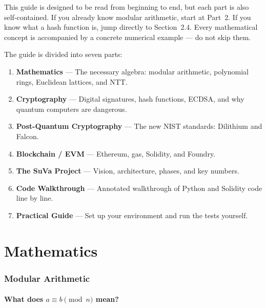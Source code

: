 \documentclass[11pt,a4paper]{article}
\begin{document}
\begin{infobox}
This guide is designed to be read from beginning to end, but each part is also self-contained.
If you already know modular arithmetic, start at Part~2.
If you know what a hash function is, jump directly to Section~2.4.
Every mathematical concept is accompanied by a concrete numerical example --- do not skip them.
\end{infobox}

The guide is divided into seven parts:

\begin{enumerate}
  \item \textbf{Mathematics} --- The necessary algebra: modular arithmetic, polynomial rings, Euclidean lattices, and NTT.
  \item \textbf{Cryptography} --- Digital signatures, hash functions, ECDSA, and why quantum computers are dangerous.
  \item \textbf{Post-Quantum Cryptography} --- The new NIST standards: Dilithium and Falcon.
  \item \textbf{Blockchain / EVM} --- Ethereum, gas, Solidity, and Foundry.
  \item \textbf{The SuVa Project} --- Vision, architecture, phases, and key numbers.
  \item \textbf{Code Walkthrough} --- Annotated walkthrough of Python and Solidity code line by line.
  \item \textbf{Practical Guide} --- Set up your environment and run the tests yourself.
\end{enumerate}

\newpage

\part{Mathematics}

\section{Modular Arithmetic}

\subsection{What does $a \equiv b \pmod{n}$ mean?}
\end{document}

